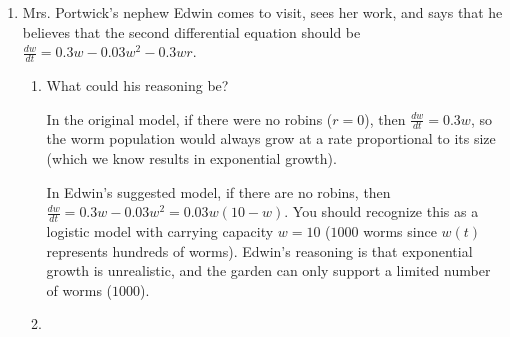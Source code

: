 \documentclass[main]{subfiles}
\begin{document}
\begin{enumerate}
\begin{enumerate}
\end{enumerate}


\pspace{\newpage}


\item 
Mrs. Portwick's nephew Edwin comes to visit, sees her work, and says
that he believes that the second differential equation should be
$\displaystyle \frac{dw}{dt} = 0.3w - 0.03 w^2 - 0.3wr$.

\begin{enumerate}
  \item
  \begin{problem}[0.5in]
  What could his reasoning be?
  \end{problem}

  \begin{solution}
  In the original model, if there were no robins ($r = 0$), then
  $\frac{dw}{dt} = 0.3 w$, so the worm population would always grow at
  a rate proportional to its size (which we know results in
  exponential growth).

  In Edwin's suggested model, if there are no robins, then
  $\frac{dw}{dt} = 0.3 w - 0.03 w^2 = 0.03 w (10 - w)$.  You should
  recognize this as a logistic model with carrying capacity $w = 10$
  ($1000$ worms since $w(t)$ represents hundreds of worms).  Edwin's
  reasoning is that exponential growth is unrealistic, and the garden
  can only support a limited number of worms ($1000$).
  \end{solution}

  \item



\end{enumerate}
\end{enumerate}
\end{document}
